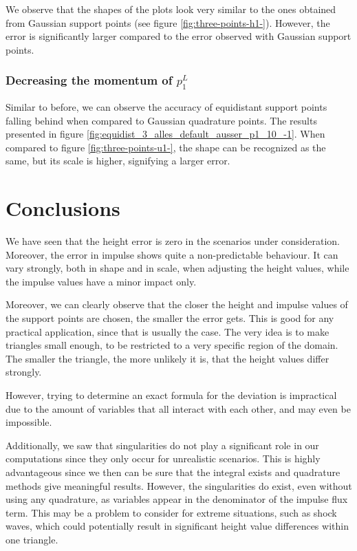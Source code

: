 \documentclass{article}
\begin{document}


We observe that the shapes of the plots look very similar to the ones obtained from Gaussian support points (see figure \ref{fig:three-points-h1-}). However, the error is significantly larger compared to the error observed with Gaussian support points.

\subsubsection{Decreasing the momentum of $p_1^L$}
\label{sec:equidist-3-on-point-var-decr-momentum-p1}



Similar to before, we can observe the accuracy of equidistant support points falling behind when compared to Gaussian quadrature points.
The results presented in figure \ref{fig:equidist_3_alles_default_ausser_p1_10_-1}.
When compared to figure \ref{fig:three-points-u1-}, the shape can be recognized as the same, but its scale is higher, signifying a larger error.

\clearpage{}

\section{Conclusions}
\label{sec:conslusions}

We have seen that the height error is zero in the scenarios under consideration. Moreover, the error in impulse shows quite a non-predictable behaviour.
It can vary strongly, both in shape and in scale, when adjusting the height values, while the impulse values have a minor impact only.

Moreover, we can clearly observe that the closer the height and impulse values of the support points are chosen, the smaller the error gets.
This is good for any practical application, since that is usually the case.
The very idea is to make triangles small enough, to be restricted to a very specific region of the domain.
The smaller the triangle, the more unlikely it is, that the height values differ strongly.

However, trying to determine an exact formula for the deviation is impractical due to the amount of variables that all interact with each other, and may even be impossible.

Additionally, we saw that singularities do not play a significant role in our computations since they only occur for unrealistic scenarios.
This is highly advantageous since we then can be sure that the integral exists and quadrature methods give meaningful results.
However, the singularities do exist, even without using any quadrature, as variables appear in the denominator of the impulse flux term.
This may be a problem to consider for extreme situations, such as shock waves, which could potentially result in significant height value differences within one triangle.
\end{document}
